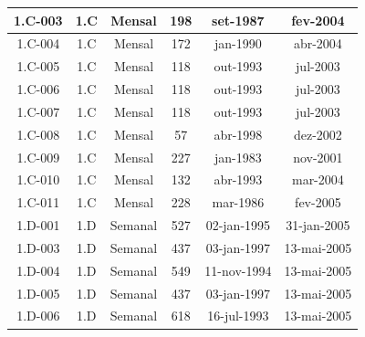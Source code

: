 \begin{center}
\begin{xtabular}{c|c|c|c|c|c}
    {\scriptsize 1.C-003} & {\scriptsize 1.C}   & {\scriptsize Mensal} & {\scriptsize 198}   & {\scriptsize set-1987} & {\scriptsize fev-2004} \\ \hline
    {\scriptsize 1.C-004} & {\scriptsize 1.C}   & {\scriptsize Mensal} & {\scriptsize 172}   & {\scriptsize jan-1990} & {\scriptsize abr-2004} \\ \hline
    {\scriptsize 1.C-005} & {\scriptsize 1.C}   & {\scriptsize Mensal} & {\scriptsize 118}   & {\scriptsize out-1993} & {\scriptsize jul-2003} \\ \hline
    {\scriptsize 1.C-006} & {\scriptsize 1.C}   & {\scriptsize Mensal} & {\scriptsize 118}   & {\scriptsize out-1993} & {\scriptsize jul-2003} \\ \hline
    {\scriptsize 1.C-007} & {\scriptsize 1.C}   & {\scriptsize Mensal} & {\scriptsize 118}   & {\scriptsize out-1993} & {\scriptsize jul-2003} \\ \hline
    {\scriptsize 1.C-008} & {\scriptsize 1.C}   & {\scriptsize Mensal} & {\scriptsize 57 }   & {\scriptsize abr-1998} & {\scriptsize dez-2002} \\ \hline
    {\scriptsize 1.C-009} & {\scriptsize 1.C}   & {\scriptsize Mensal} & {\scriptsize 227}   & {\scriptsize jan-1983} & {\scriptsize nov-2001} \\ \hline
    {\scriptsize 1.C-010} & {\scriptsize 1.C}   & {\scriptsize Mensal} & {\scriptsize 132}   & {\scriptsize abr-1993} & {\scriptsize mar-2004} \\ \hline
    {\scriptsize 1.C-011} & {\scriptsize 1.C}   & {\scriptsize Mensal} & {\scriptsize 228}   & {\scriptsize mar-1986} & {\scriptsize fev-2005} \\ \hline
    {\scriptsize 1.D-001} & {\scriptsize 1.D}   & {\scriptsize Semanal} & {\scriptsize 527 }  & {\scriptsize 02-jan-1995} & {\scriptsize 31-jan-2005} \\ \hline
    {\scriptsize 1.D-003} & {\scriptsize 1.D}   & {\scriptsize Semanal} & {\scriptsize 437 }  & {\scriptsize 03-jan-1997} & {\scriptsize 13-mai-2005} \\ \hline
    {\scriptsize 1.D-004} & {\scriptsize 1.D}   & {\scriptsize Semanal} & {\scriptsize 549 }  & {\scriptsize 11-nov-1994} & {\scriptsize 13-mai-2005} \\ \hline
    {\scriptsize 1.D-005} & {\scriptsize 1.D}   & {\scriptsize Semanal} & {\scriptsize 437 }  & {\scriptsize 03-jan-1997} & {\scriptsize 13-mai-2005} \\ \hline
    {\scriptsize 1.D-006} & {\scriptsize 1.D}   & {\scriptsize Semanal} & {\scriptsize 618 }  & {\scriptsize 16-jul-1993} & {\scriptsize 13-mai-2005} \\ \hline

\end{xtabular}
\end{center}
